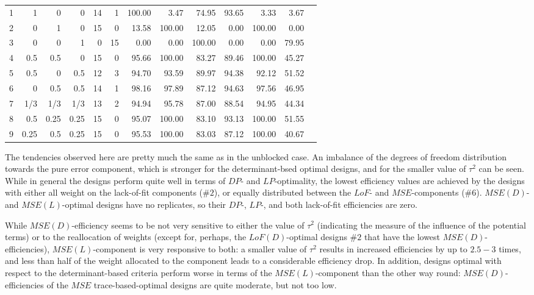 \begin{table}[h]
{\begin{tabular}{rrrrrrrrrrrrr}
1 & 1 & 0 & 0 & \multicolumn{1}{|r}{14} & \multicolumn{1}{r|}{1} & 100.00 & 3.47 & 74.95 & \multicolumn{1}{|r}{93.65} & 3.33 & 3.67 \\
2 & 0 & 1 & 0 & \multicolumn{1}{|r}{15} & \multicolumn{1}{r|}{0} & 13.58 & 100.00 & 12.05 & \multicolumn{1}{|r}{0.00} & 100.00 & 0.00 \\
3 & 0 & 0 & 1 & \multicolumn{1}{|r}{0} & \multicolumn{1}{r|}{15} & 0.00 & 0.00 & 100.00 & \multicolumn{1}{|r}{0.00} & 0.00 & 79.95 \\
4 & 0.5 & 0.5 & 0 & \multicolumn{1}{|r}{15} & \multicolumn{1}{r|}{0} & 95.66 & 100.00 & 83.27 & \multicolumn{1}{|r}{89.46} & 100.00 & 45.27 \\
5 & 0.5 & 0 & 0.5 & \multicolumn{1}{|r}{12} & \multicolumn{1}{r|}{3} & 94.70 & 93.59 & 89.97 & \multicolumn{1}{|r}{94.38} & 92.12 & 51.52 \\
6 & 0 & 0.5 & 0.5 & \multicolumn{1}{|r}{14} & \multicolumn{1}{r|}{1} & 98.16 & 97.89 & 87.12 & \multicolumn{1}{|r}{94.63} & 97.56 & 46.95 \\
7 & 1/3 & 1/3 & 1/3 & \multicolumn{1}{|r}{13} & \multicolumn{1}{r|}{2} & 94.94 & 95.78 & 87.00 & \multicolumn{1}{|r}{88.54} & 94.95 & 44.34 \\
8 & 0.5 & 0.25 & 0.25 & \multicolumn{1}{|r}{15} & \multicolumn{1}{r|}{0} & 95.07 & 100.00 & 83.10 & \multicolumn{1}{|r}{93.13} & 100.00 & 51.55 \\
9 & 0.25 & 0.5 & 0.25 & \multicolumn{1}{|r}{15} & \multicolumn{1}{r|}{0} & 95.53 & 100.00 & 83.03 & \multicolumn{1}{|r}{87.12} & 100.00 & 40.67
\end{tabular}
}
\end{table}

The tendencies observed here are pretty much the same as in the unblocked case. An imbalance of the degrees of freedom distribution towards the pure error component, which is stronger for the determinant-bsed optimal designs, and for the smaller value of $\tau^2$ can be seen. While in general the designs perform quite well in terms of $DP$- and $LP$-optimality, the lowest efficiency values are achieved by the designs with either all weight on the lack-of-fit components (\#$2$), or equally distributed between the $LoF$- and $MSE$-components (\#$6$). $MSE(D)$- and $MSE(L)$-optimal designs have no replicates, so their $DP$-, $LP$-, and both lack-of-fit efficiencies are zero.

While $MSE(D)$-efficiency seems to be not very sensitive to either the value of $\tau^2$ (indicating the measure of the influence of the potential terms) or to the reallocation of weights (except for, perhaps, the $LoF(D)$-optimal designs \#$2$ that have the lowest $MSE(D)$-efficiencies), $MSE(L)$-component is very responsive to both: a smaller value of $\tau^2$ results in increased efficiencies by up to $2.5-3$ times, and less than half of the weight allocated to the component leads to a considerable efficiency drop. In addition, designs optimal with respect to the determinant-based criteria perform worse in terms of the $MSE(L)$-component than the other way round: $MSE(D)$-efficiencies of the $MSE$ trace-based-optimal designs are quite moderate, but not too low.   

